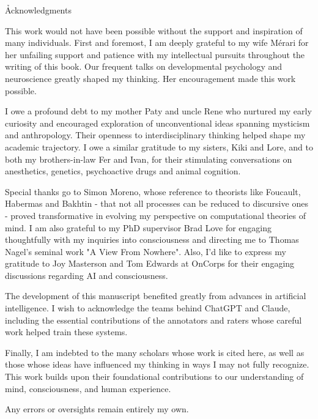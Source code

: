 \h{Acknowledgments}

This work would not have been possible without the support and inspiration of many individuals. First and foremost, I am deeply grateful to my wife Mérari for her unfailing support and patience with my intellectual pursuits throughout the writing of this book. Our frequent talks on developmental psychology and neuroscience greatly shaped my thinking. Her encouragement made this work possible.

I owe a profound debt to my mother Paty and uncle Rene who nurtured my early curiosity and encouraged exploration of unconventional ideas spanning mysticism and anthropology. Their openness to interdisciplinary thinking helped shape my academic trajectory. I owe a similar gratitude to my sisters, Kiki and Lore, and to both my brothers-in-law Fer and Ivan, for their stimulating conversations on anesthetics, genetics, psychoactive drugs and animal cognition. 

Special thanks go to Simon Moreno, whose reference to theorists like Foucault, Habermas and Bakhtin - that not all processes can be reduced to discursive ones - proved transformative in evolving my perspective on computational theories of mind. I am also grateful to my PhD supervisor Brad Love for engaging thoughtfully with my inquiries into consciousness and directing me to Thomas Nagel's seminal work "A View From Nowhere". Also, I'd like to express my gratitude to Joy Masterson and Tom Edwards at OnCorps for their engaging discussions regarding AI and consciousness. 

The development of this manuscript benefited greatly from advances in artificial intelligence. I wish to acknowledge the teams behind ChatGPT and Claude, including the essential contributions of the annotators and raters whose careful work helped train these systems.

Finally, I am indebted to the many scholars whose work is cited here, as well as those whose ideas have influenced my thinking in ways I may not fully recognize. This work builds upon their foundational contributions to our understanding of mind, consciousness, and human experience.

Any errors or oversights remain entirely my own.